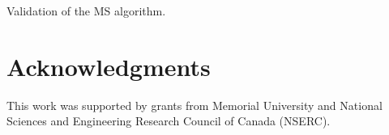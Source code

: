 \documentclass[
aip,
rsi,%
amsmath,amssymb,
reprint,%
]{revtex4-1}
\begin{document}
Validation of the MS algorithm. 

\section{Acknowledgments}

This work was supported by grants from Memorial University and National Sciences and Engineering Research Council of Canada (NSERC).  


%
\end{document}
